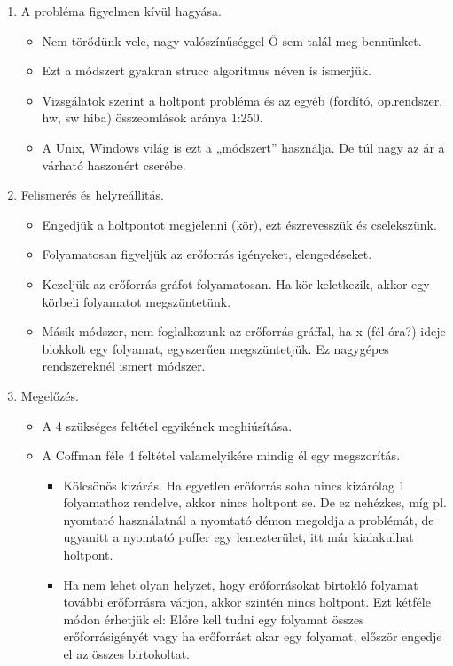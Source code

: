 \documentclass[margin=0px]{article}
\begin{document}
\begin{enumerate}
    \item A probléma figyelmen kívül hagyása.
          \begin{itemize}
              \item Nem törődünk vele, nagy valószínűséggel Ő sem talál meg bennünket.
              \item Ezt a módszert gyakran strucc algoritmus néven is ismerjük.
              \item Vizsgálatok szerint a holtpont probléma és az egyéb (fordító, op.rendszer, hw, sw hiba) összeomlások aránya 1:250.
              \item A Unix, Windows világ is ezt a „módszert”	használja. De túl nagy az ár a várható haszonért cserébe.
          \end{itemize}
    \item Felismerés és helyreállítás.
          \begin{itemize}
              \item Engedjük a holtpontot megjelenni (kör), ezt észrevesszük és cselekszünk.
              \item Folyamatosan figyeljük az erőforrás igényeket, elengedéseket.
              \item Kezeljük az erőforrás gráfot folyamatosan. Ha kör keletkezik, akkor egy körbeli folyamatot megszüntetünk.
              \item Másik módszer, nem foglalkozunk az erőforrás gráffal, ha x (fél óra?) ideje 	blokkolt egy folyamat, egyszerűen megszüntetjük. Ez nagygépes rendszereknél ismert módszer.
          \end{itemize}
    \item Megelőzés.
          \begin{itemize}
              \item A 4 szükséges feltétel egyikének meghiúsítása.
              \item A Coffman féle 4 feltétel valamelyikére mindig él egy megszorítás.
                    \begin{itemize}
                        \item Kölcsönös kizárás. Ha egyetlen erőforrás soha nincs kizárólag 1 folyamathoz rendelve, akkor nincs holtpont se. De ez nehézkes, míg pl. nyomtató használatnál a
                              nyomtató démon megoldja a problémát, de ugyanitt a nyomtató puffer egy lemezterület, itt már kialakulhat holtpont.
                        \item Ha nem lehet olyan helyzet, hogy erőforrásokat birtokló folyamat további erőforrásra várjon, akkor szintén nincs holtpont. Ezt kétféle módon érhetjük el: Előre kell tudni egy folyamat összes erőforrásigényét vagy ha erőforrást akar egy folyamat, először engedje el az összes birtokoltat.

\end{itemize}
\end{itemize}
\end{enumerate}
\end{document}
